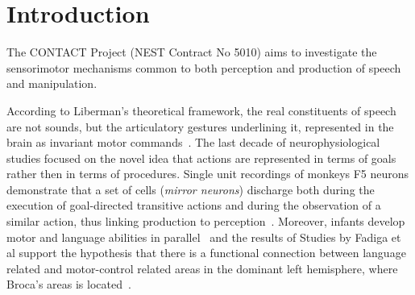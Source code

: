\section{Introduction}
\label{ch:intro}
The CONTACT Project (NEST Contract No 5010) aims to investigate the
sensorimotor mechanisms common to both perception and production of speech and
manipulation.

According to Liberman's theoretical framework,
the real constituents of speech are not sounds, but the articulatory
gestures underlining it, represented in the brain as invariant motor 
commands~\citep{liberman.mattingly:1985}.
The last decade of neurophysiological studies focused on the novel idea that
actions are represented in terms of goals rather then in terms of
procedures. 
Single unit recordings of monkeys F5 neurons demonstrate that a set of cells
(\emph{mirror neurons}) discharge both during the execution of goal-directed 
transitive  actions and during the observation of a similar action, thus 
linking production to perception~\citep{rizzolatti.etal:1988,rizzolatti.etal:1996,rizzolatti.fadiga:1998}. 
Moreover, infants develop motor and language abilities in
parallel~\citep{lennenberg:1967,kandel.schwartz.jessel:2000} and the results of
Studies by Fadiga et al support
%
%
the hypothesis that there is a functional connection between language related
and motor-control related areas in the dominant left
hemisphere, where Broca's areas is located~\citep{fadiga.etal:PRESS}. 


